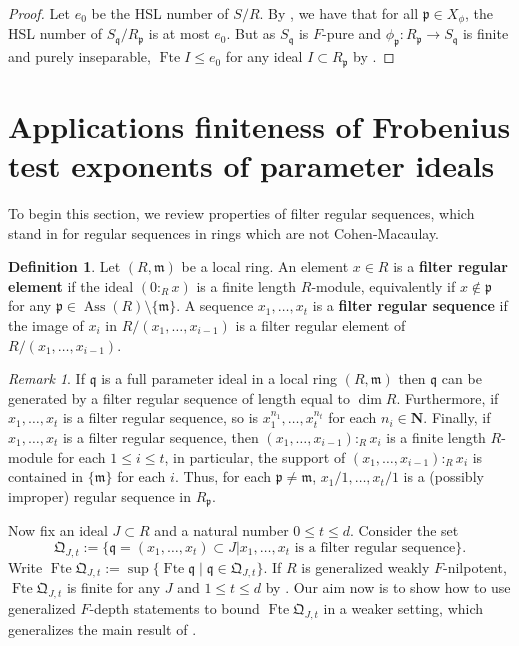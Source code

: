 \documentclass{amsproc}
\theoremstyle{definition}
\newtheorem{definition}[theorem]{Definition}
\theoremstyle{remark}
\newtheorem{remark}[theorem]{Remark}
\numberwithin{equation}{section}
\newcommand{\NN}{\mathbf{N}}
\newcommand{\fm}{\mathfrak{m}}
\newcommand{\fp}{\mathfrak{p}}
\newcommand{\fq}{\mathfrak{q}}
\newcommand{\fte}{\operatorname{Fte}}
\newcommand{\fQ}{\mathfrak{Q}}
\begin{document}
\begin{proof} 
Let $e_0$ be the HSL number of $S/R$. By , we have that for all $\fp \in X_\phi$, the HSL number of $S_{\fq}/R_\fp$ is at most $e_0$. But as $S_\fq$ is $F$-pure and $\phi_\fp:R_\fp\rightarrow S_\fq$ is finite and purely inseparable, $\fte I \le e_0$ for any ideal $I\subset R_\fp$ by \cite[Rmk. 4.5]{DMP24}.
\end{proof}


\section{Applications finiteness of Frobenius test exponents of parameter ideals}\label{sec:genfte}  
To begin this section, we review properties of filter regular sequences, which stand in for regular sequences in rings which are not Cohen-Macaulay.

\begin{definition}
    Let $(R,\fm)$ be a local ring. An element $x \in R$ is a \textbf{filter regular element} if the ideal $(0:_R x)$ is a finite length $R$-module, equivalently if $x \not \in \fp$ for any $\fp \in \operatorname{Ass}(R) \setminus \{\fm\}$. A sequence $x_1,\ldots,x_t$ is a \textbf{filter regular sequence} if the image of $x_i$ in $R/(x_1,\ldots,x_{i-1})$ is a filter regular element of $R/(x_1,\ldots,x_{i-1})$.
\end{definition}

\begin{remark}\label{rmk: filter regular facts}
If $\fq$ is a full parameter ideal in a local ring $(R,\fm)$ then $\fq$ can be generated by a filter regular sequence of length equal to $\dim R$. Furthermore, if $x_1,\ldots,x_t$ is a filter regular sequence, so is $x_1^{n_1},\ldots,x_t^{n_t}$ for each $n_i \in \NN$. Finally, if $x_1,\ldots,x_t$ is a filter regular sequence, then $(x_1,\ldots,x_{i-1}):_R x_i$ is a finite length $R$-module for each $1 \le i \le t$, in particular, the support of $(x_1,\ldots,x_{i-1}):_R x_i$ is contained in $\{\fm\}$ for each $i$. Thus, for each $\fp \neq \fm$, $x_1/1,\ldots,x_t/1$ is a (possibly improper) regular sequence in $R_\fp$. 
\end{remark}


Now fix an ideal $J \subset R$ and a natural number $0 \leq t \leq d$. Consider the set $$\fQ_{J,t} := \{ \fq = (x_1,\ldots,x_t) \subset J \left| x_1,\ldots,x_t \textrm{ is a filter regular sequence} \right. \}.$$ Write $\fte \fQ_{J,t} := \sup\{\fte \fq \mid \fq \in \fQ_{J,t}\}.$ If $R$ is generalized weakly $F$-nilpotent, $\fte \fQ_{J,t}$ is finite for any $J$ and $1 \le t \le d$  by . Our aim now is to show how to use generalized $F$-depth statements to bound $\fte \fQ_{J,t}$ in a weaker setting, which generalizes the main result of \cite{HQ22}.  
\end{document}
